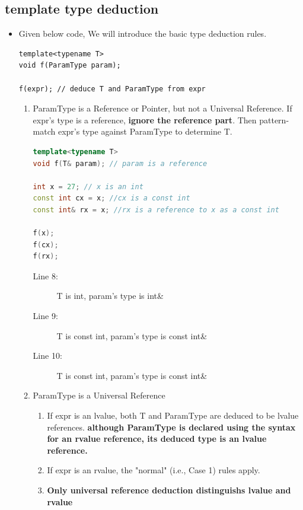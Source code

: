 \documentclass[a4paper,11pt,twoside]{book}
\begin{document}
\subsection{template type deduction}
\begin{itemize}

	\item Given below code, We will introduce the basic type deduction rules.
\begin{lstlisting}[numbers=none]
template<typename T>
void f(ParamType param);

f(expr); // deduce T and ParamType from expr
\end{lstlisting}

\begin{enumerate}
	
	\item ParamType is a Reference or Pointer, but not a Universal Reference. If expr's type is a reference, \textbf{ignore the reference part}. Then pattern-match expr's type against ParamType to determine T.
\begin{lstlisting}[frame=single, language=c++]
template<typename T>
void f(T& param); // param is a reference
	
int x = 27; // x is an int
const int cx = x; //cx is a const int
const int& rx = x; //rx is a reference to x as a const int
	
f(x); 
f(cx);  
f(rx); 
\end{lstlisting}
\begin{description}
	\item[Line 8:]  T is int, param's type is int\&
	\item[Line 9:]  T is const int, param's type is const int\&
	\item[Line 10:] T is const int, param's type is const int\&
\end{description}
	
	\item ParamType is a Universal Reference
	
	\begin{enumerate}
		\item If expr is an lvalue, both T and ParamType are deduced to be lvalue references.
		\textbf{although ParamType is declared using the syntax for an rvalue reference, its deduced type is an lvalue reference.}
		
		\item If expr is an rvalue, the "normal" (i.e., Case 1) rules apply.
		
		\item \textbf{Only universal reference deduction distinguishs lvalue and rvalue}
	\end{enumerate}
	

\end{enumerate}
\end{itemize}
\end{document}
